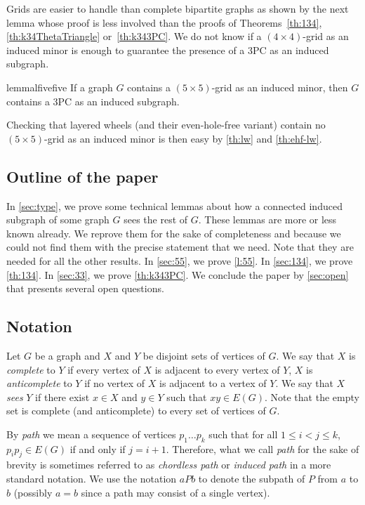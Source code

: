 \documentclass[11pt]{article}
\theoremstyle{definition}
\theoremstyle{definition}
\begin{document}
Grids are easier to handle than complete bipartite graphs as shown by the next lemma whose proof is less involved than the proofs of Theorems~\ref{th:134}, \ref{th:k34ThetaTriangle} or~\ref{th:k343PC}. We do not know if a $(4\times 4)$-grid as an induced minor is enough to guarantee the presence of a 3PC as an induced subgraph.  

\begin{restatable}{lemma}{lfivefive}
\label{l:55}
    If a graph $G$ contains a $(5\times 5)$-grid as an induced minor, then $G$ contains a 3PC as an induced subgraph.
\end{restatable}

 Checking
that layered wheels (and their even-hole-free variant) contain no $(5\times 5)$-grid as an induced minor is then easy by \cref{th:lw} and \cref{th:ehf-lw}. 

\subsection*{Outline of the paper}

In \cref{sec:type}, we prove some technical lemmas about how a
connected induced subgraph of some graph $G$ sees the rest of $G$.
These lemmas are more or less  known already. We reprove them for the sake of completeness and because we could not find them with the precise
statement that we need.  Note that they are needed for all the other results.  In \cref{sec:55}, we prove \cref{l:55}. In \cref{sec:134}, we
prove \cref{th:134}.  In \cref{sec:33}, we prove \cref{th:k343PC}.  We conclude the paper by \cref{sec:open} that presents several open questions. 



\subsection*{Notation}

Let $G$ be a graph and $X$ and $Y$ be disjoint sets of vertices of $G$.
We say that $X$ is \emph{complete} to $Y$ if every vertex of $X$
is adjacent to every vertex of $Y$, $X$ is \emph{anticomplete} to $Y$
if  no vertex of $X$ is adjacent to a vertex of $Y$.  We say that
$X$ \emph{sees} $Y$ if there exist $x\in X$ and $y \in Y$ such that
$xy\in E(G)$.  Note that the empty set is complete (and anticomplete)
to every set of vertices of $G$.  

By \emph{path} we mean a sequence of vertices $p_1 \dots p_k$ such
that for all $1\leq i<j \leq k$, $p_ip_j \in E(G)$ if and only if $j=i+1$.
Therefore, what we call \emph{path} for the sake of brevity
is sometimes referred to as \emph{chordless path} or \emph{induced path} in a more standard notation.
We use the notation $aPb$ to denote
the subpath of $P$ from $a$ to $b$ (possibly $a=b$ since a path may
consist of a single vertex).
\end{document}
